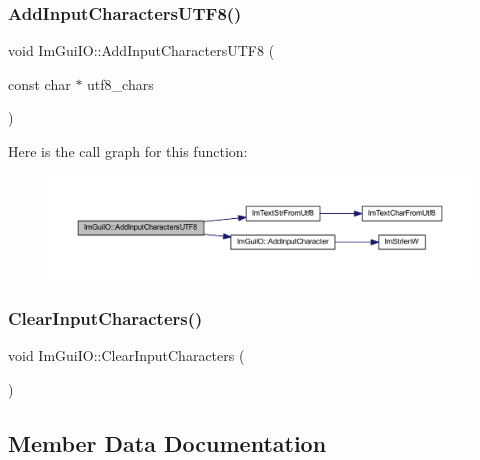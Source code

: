 \subsubsection{\texorpdfstring{Add\+Input\+Characters\+U\+T\+F8()}{AddInputCharactersUTF8()}}
{\footnotesize\ttfamily void Im\+Gui\+I\+O\+::\+Add\+Input\+Characters\+U\+T\+F8 (\begin{DoxyParamCaption}\item[{const char $\ast$}]{utf8\+\_\+chars }\end{DoxyParamCaption})}

Here is the call graph for this function\+:
\nopagebreak
\begin{figure}[H]
\begin{center}
\leavevmode
\includegraphics[width=350pt]{struct_im_gui_i_o_adaf150a1908c02c3cae15a35915bbb26_cgraph}
\end{center}
\end{figure}
\mbox{\label{struct_im_gui_i_o_a82d8794e14e628efbb026af4202c70ca}} 
\subsubsection{\texorpdfstring{Clear\+Input\+Characters()}{ClearInputCharacters()}}
{\footnotesize\ttfamily void Im\+Gui\+I\+O\+::\+Clear\+Input\+Characters (\begin{DoxyParamCaption}{ }\end{DoxyParamCaption})\hspace{0.3cm}{\ttfamily [inline]}}



\subsection{Member Data Documentation}
\mbox{\label{struct_im_gui_i_o_a92288d3e802788c8c408eac2c12e709c}} 
